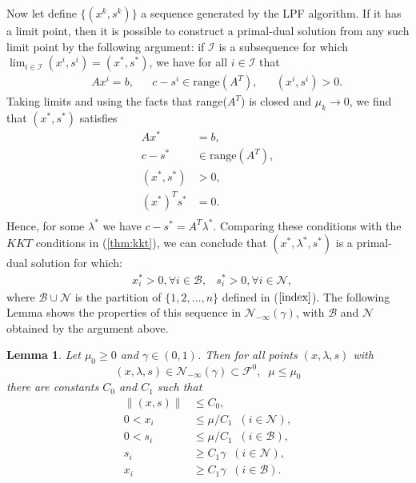 \documentclass[a4paper,10 pt,titlepage,twoside]{book}
\theoremstyle{plain}
\newtheorem{lem}[thm]{Lemma}
\theoremstyle{definition}
\theoremstyle{remark}
\begin{document}
Now let define $\{(x^{k},s^{k})\}$ a sequence generated by the LPF algorithm. If it has a limit point, then it is possible to construct a primal-dual solution from any such limit point by the following argument: if $\mathcal{I}$ is a subsequence for which $\lim_{i\in\mathcal{I}}(x^{i},s^{i})=(x^{*},s^{*})$, we have for all $i\in\mathcal{I}$ that
\begin{alignat*}
&&Ax^{i}= b, &&c - s^{i}\in \text{range}(A^{T}), &&(x^{i},s^{i})>0.
\end{alignat*}
Taking limits and using the facts that range($A^{T}$) is closed and $\mu_{k}\to 0$, we find that $(x^{*},s^{*})$ satisfies
\begin{align*}
Ax^{*}&= b,\\c-s^{*}&\in\text{range}(A^{T}),\\(x^{*},s^{*})&>0,\\(x^{*})^{T}s^{*}&=0.\\
\end{align*}
Hence, for some $\lambda^{*}$ we have $c-s^{*}= A^{T}\lambda^{*}$. Comparing these conditions with the $KKT$ conditions in (\ref{thm:kkt}), we can conclude that $(x^{*},\lambda^{*},s^{*})$ is a primal-dual solution for which:
\begin{align*}
&x^{*}_{i}>0, \forall i \in\mathcal{B},
&s^{*}_{i}>0, \forall i \in\mathcal{N},
\end{align*}
where $\mathcal{B}\cup\mathcal{N}$ is the partition of $\{1,2,\dots,n\}$ defined in ($\ref{index}$).
The following Lemma shows the properties of this sequence in $\mathcal{N}_{-\infty}(\gamma)$, with $\mathcal{B}$ and $\mathcal{N}$ obtained by the argument above.
\begin{lem}
	Let $\mu_{0}\geq 0$ and $\gamma\in(0,1)$. Then for all points $(x,\lambda,s)$ with
	\begin{equation*}
	(x,\lambda,s)\in\mathcal{N}_{-\infty}(\gamma)\subset\mathcal{F}^{0}, \;\; \mu \leq \mu_{0}
	\end{equation*}
	there are constants $C_{0}$ and $C_{1}$ such that
	\begin{align*}
	\lVert(x,s) \rVert&\leq C_{0},\tag{B}\label{B}\\0< x_{i}&\leq \mu/C_{1}\;\; (i \in\mathcal{N}),\\
	0< s_{i}&\leq \mu/C_{1}\;\; (i \in\mathcal{B}),\\ 
	s_{i}&\geq C_{1}\gamma \;\; (i \in\mathcal{N}),\\
	x_{i}&\geq C_{1}\gamma \;\; (i \in\mathcal{B}).\\
	\end{align*}
\end{lem}
\end{document}
